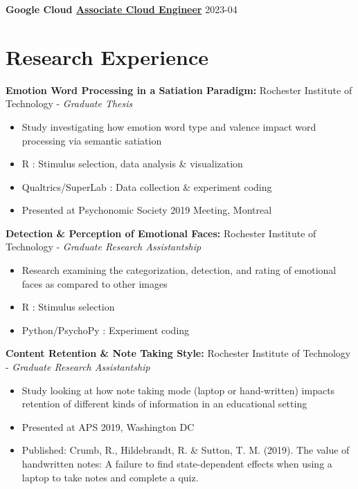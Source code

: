 \documentclass[a4paper,9pt]{extarticle}
\begin{document}
\noindent
\textbf{Google Cloud \href{https://google.accredible.com/d3ef369f-9c2c-486a-bda6-943a74f70dff}{Associate Cloud Engineer}} \hfill 2023-04



\section*{Research Experience}

\noindent
\textbf{Emotion Word Processing in a Satiation Paradigm:}
Rochester Institute of Technology - \textit{Graduate Thesis}
\begin{itemize}

\item Study investigating how emotion word type and valence impact word processing via semantic satiation
\item R : Stimulus selection, data analysis \& visualization
\item Qualtrics/SuperLab : Data collection \& experiment coding
\item Presented at Psychonomic Society 2019 Meeting, Montreal
\end{itemize}

\noindent
\textbf{Detection \& Perception of Emotional Faces:}
Rochester Institute of Technology - \textit{Graduate Research Assistantship}
\begin{itemize}

\item Research examining the categorization, detection, and rating of emotional faces as compared to other images
\item R : Stimulus selection
\item Python/PsychoPy : Experiment coding
\end{itemize}

\noindent
\textbf{Content Retention \& Note Taking Style:}
Rochester Institute of Technology - \textit{Graduate Research Assistantship}
\begin{itemize}

\item Study looking at how note taking mode (laptop or hand-written) impacts retention of different kinds of information in an educational setting
\item Presented at APS 2019, Washington DC
\item Published: Crumb, R., Hildebrandt, R. \& Sutton, T. M. (2019). The value of handwritten notes: A failure to find state-dependent effects when using a laptop to take notes and complete a quiz.
\end{itemize}
\end{document}
